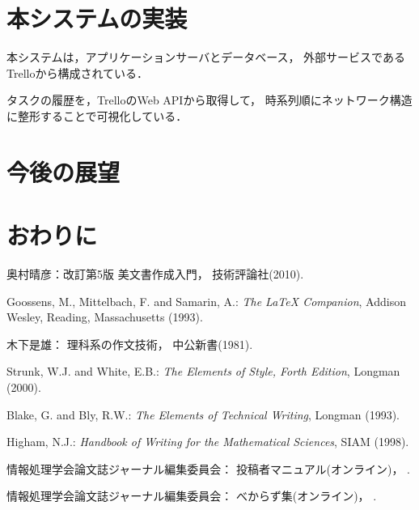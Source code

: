 \documentclass[submit,techrep]{ipsj}
\begin{document}
\section{本システムの実装}
\label{implementation}

本システムは，アプリケーションサーバとデータベース，
外部サービスであるTrelloから構成されている．

タスクの履歴を，TrelloのWeb APIから取得して，
時系列順にネットワーク構造に整形することで可視化している．

\section{今後の展望}

\section{おわりに}

\begin{thebibliography}{9}
奥村晴彦：改訂第5版 \LaTeXe 美文書作成入門，
技術評論社(2010).

Goossens, M., Mittelbach, F. and Samarin, A.: {\it The LaTeX Companion},
Addison Wesley, Reading, Massachusetts (1993).

木下是雄：
理科系の作文技術，
中公新書(1981).

Strunk, W.J. and White, E.B.: {\it The Elements of Style, Forth Edition},
Longman (2000).

Blake, G. and Bly, R.W.: {\it The Elements of Technical Writing},
Longman (1993).

Higham, N.J.:
{\it Handbook of Writing for the Mathematical Sciences},
SIAM (1998).

情報処理学会論文誌ジャーナル編集委員会：
投稿者マニュアル(オンライン)，
%
.

情報処理学会論文誌ジャーナル編集委員会：
べからず集(オンライン)，
%
.

\end{thebibliography}

\begin{biography}
%
%
\end{biography}
\end{document}
